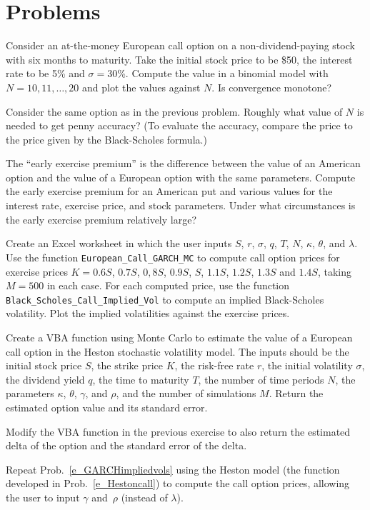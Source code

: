 \section*{Problems}
\begin{prob} Consider an at-the-money European call option on a non-dividend-paying stock with six months to maturity.  Take the initial stock price to be \$50, the interest rate to be 5\% and $\sigma=$30\%.  Compute the value in a binomial model with $N=10, 11, \ldots, 20$ and plot the values against $N$.  Is convergence monotone?
\end{prob}\begin{prob} Consider the same option as in the previous problem.  Roughly what value of $N$ is needed to get penny accuracy?  (To evaluate the accuracy, compare the price to the price given by the Black-Scholes formula.)
\end{prob}\begin{prob}  The ``early exercise premium''  is the difference between the value of an American option and the value of a European option with the same parameters.  Compute the early exercise premium for an American put and various values for the interest rate, exercise price, and stock parameters.  Under what circumstances is the early exercise premium relatively large?
\end{prob}\begin{prob} \label{e_GARCHimpliedvols} Create an Excel worksheet in which the user inputs $S$, $r$, $\sigma$, $q$, $T$, $N$, $\kappa$, $\theta$, and $\lambda$.  Use the function \verb!European_Call_GARCH_MC! to compute call option prices for exercise prices $K=0.6S$, $0.7S$, $0,8S$, $0.9S$, $S$, $1.1S$, $1.2S$, $1.3S$ and $1.4S$, taking $M=500$ in each case.  For each computed price, use the function \verb!Black_Scholes_Call_Implied_Vol! to compute an implied Black-Scholes volatility.  Plot the implied volatilities against the exercise prices.
\end{prob}\begin{prob} \label{e_Hestoncall} Create a VBA function using Monte Carlo to estimate the value of a European call option in the Heston stochastic volatility model.  The inputs should be the initial stock price $S$, the strike price $K$, the risk-free rate $r$, the initial volatility $\sigma$, the dividend yield $q$, the time to maturity $T$, the number of time periods $N$, the parameters  $\kappa$, $\theta$, $\gamma$, and $\rho$, and the number of simulations $M$.  Return the estimated option value and its standard error.  
\end{prob}\begin{prob} Modify the VBA function in the previous exercise to also return the estimated delta of the option and the standard error of the delta.
\end{prob}\begin{prob} Repeat Prob.~\ref{e_GARCHimpliedvols} using the Heston model (the function developed in Prob.~\ref{e_Hestoncall}) to compute the call option prices, allowing the user to input $\gamma$ and~$\rho$ (instead of $\lambda$).  
\end{prob}

